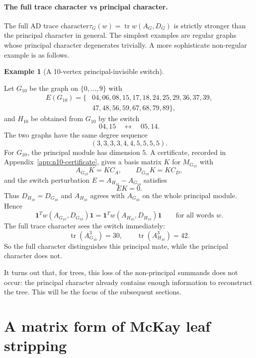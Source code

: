 \documentclass[a4paper,fleqn]{cas-sc}
\theoremstyle{definition}
\newtheorem{example}[theorem]{Example}
\theoremstyle{remark}
\newcommand{\tr}{\operatorname{tr}}
\begin{document}
\paragraph{The full trace character vs principal character.} The full AD trace character$\tau_G(w)=\tr w(A_G,D_G)$ is strictly stronger than the principal character in general. The simplest examples are regular graphs whose principal character degenerates trivially. A more sophisticate non-regular example is as follows. 

\begin{example}[A 10-vertex principal-invisible switch]
\label{ex:n10-counterexample}

Let \(G_{10}\) be
the graph on \(\{0,\ldots,9\}\) with
\[
\begin{aligned}
E(G_{10})=\{&04,06,08,15,17,18,24,25,29,36,37,39,\\
            &47,48,56,59,67,68,79,89\},
\end{aligned}
\]
and \(H_{10}\) be obtained from \(G_{10}\) by the switch
\[
        04,15\quad\longleftrightarrow\quad 05,14 .
\]
The two graphs have the same degree sequence
\[
        (3,3,3,3,4,4,5,5,5,5).
\]
For \(G_{10}\), the principal module has dimension \(5\).  A certificate,
recorded in Appendix~\ref{app:n10-certificate}, gives a basis matrix \(K\) for
\(M_{G_{10}}\) with
\[
        A_{G_{10}}K=KC_A,\qquad D_{G_{10}}K=KC_D,
\]
and the switch perturbation \(E=A_{H_{10}}-A_{G_{10}}\) satisfies
\[
        EK=0.
\]
Thus \(D_{H_{10}}=D_{G_{10}}\) and \(A_{H_{10}}\) agrees with \(A_{G_{10}}\) on
the whole principal module.  Hence
\[
        \mathbf1^T w(A_{G_{10}},D_{G_{10}})\mathbf1
        =
        \mathbf1^T w(A_{H_{10}},D_{H_{10}})\mathbf1
        \qquad\text{for all words }w .
\]
The full trace character sees the switch immediately:
\[
        \operatorname{tr}(A_{G_{10}}^3)=30,
        \qquad
        \operatorname{tr}(A_{H_{10}}^3)=42 .
\]
So the full character distinguishes this principal mate, while the principal
character does not.  
\end{example}

It turns out that, for trees, this loss
of the non-principal summands does not occur: the principal character already
contains enough information to reconstruct the tree. This will be the focus of the subsequent sections.




\section{A matrix form of McKay leaf stripping}
\label{sec:trees}
\end{document}
